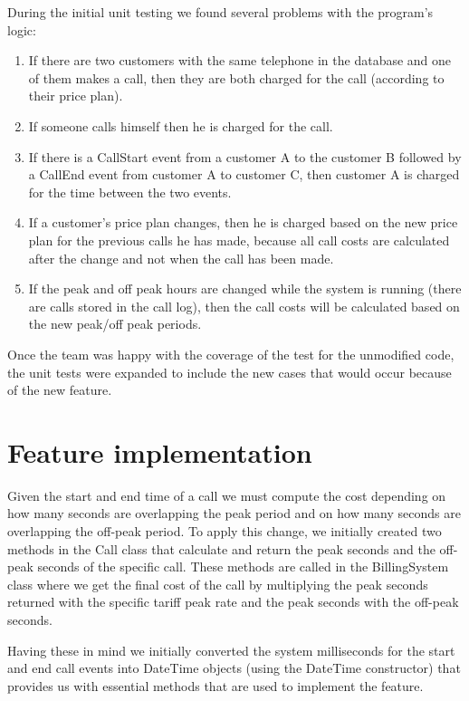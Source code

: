 \documentclass[pdftex,11pt,a4paper]{article}
\begin{document}
During the initial unit testing we found several problems with the program’s logic:

\begin{enumerate}
	\item If there are two customers with the same telephone in the database and one of them makes a call, then they are both charged for the call (according to their price plan).
	\item If someone calls himself then he is charged for the call.
	\item If there is a CallStart event from a customer A to the customer B followed by a CallEnd event from customer A to customer C, then customer A is charged for the time between the two events.
	\item If a customer’s price plan changes, then he is charged based on the new price plan for the previous calls he has made, because all call costs are calculated after the change and not when the call has been made.
	\item If the peak and off peak hours are changed while the system is running (there are calls stored in the call log), then the call costs will be calculated based on the new peak/off peak periods.
\end{enumerate}

Once the team was happy with the coverage of the test for the unmodified code, the unit tests were expanded to include the new cases that would occur because of the new feature. 

\section{Feature implementation}
Given the start and end time of a call we must compute the cost depending on how many seconds are overlapping the peak period and on how many seconds are overlapping the off-peak period. To apply this change, we initially created two methods in the Call class that calculate and return the peak seconds and the off-peak seconds of the specific call. These methods are called in the BillingSystem class where we get the final cost of the call by multiplying the peak seconds returned with the specific tariff peak rate and the peak seconds with the off-peak seconds.

Having these in mind we initially converted the system milliseconds for the start and end call events into DateTime objects (using the DateTime constructor) that provides us with essential methods that are used to implement the feature.
\end{document}
